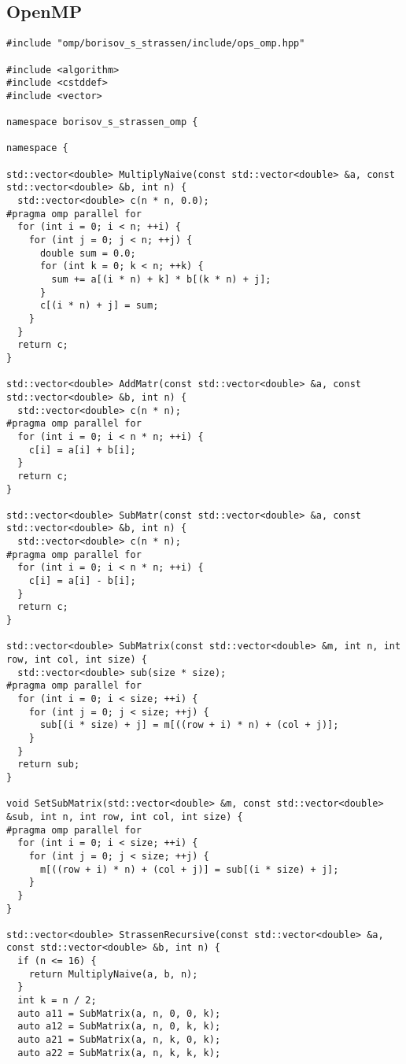 \documentclass[12pt]{article}
\begin{document}
\subsection*{OpenMP}
\begin{lstlisting}
#include "omp/borisov_s_strassen/include/ops_omp.hpp"

#include <algorithm>
#include <cstddef>
#include <vector>

namespace borisov_s_strassen_omp {

namespace {

std::vector<double> MultiplyNaive(const std::vector<double> &a, const std::vector<double> &b, int n) {
  std::vector<double> c(n * n, 0.0);
#pragma omp parallel for
  for (int i = 0; i < n; ++i) {
    for (int j = 0; j < n; ++j) {
      double sum = 0.0;
      for (int k = 0; k < n; ++k) {
        sum += a[(i * n) + k] * b[(k * n) + j];
      }
      c[(i * n) + j] = sum;
    }
  }
  return c;
}

std::vector<double> AddMatr(const std::vector<double> &a, const std::vector<double> &b, int n) {
  std::vector<double> c(n * n);
#pragma omp parallel for
  for (int i = 0; i < n * n; ++i) {
    c[i] = a[i] + b[i];
  }
  return c;
}

std::vector<double> SubMatr(const std::vector<double> &a, const std::vector<double> &b, int n) {
  std::vector<double> c(n * n);
#pragma omp parallel for
  for (int i = 0; i < n * n; ++i) {
    c[i] = a[i] - b[i];
  }
  return c;
}

std::vector<double> SubMatrix(const std::vector<double> &m, int n, int row, int col, int size) {
  std::vector<double> sub(size * size);
#pragma omp parallel for
  for (int i = 0; i < size; ++i) {
    for (int j = 0; j < size; ++j) {
      sub[(i * size) + j] = m[((row + i) * n) + (col + j)];
    }
  }
  return sub;
}

void SetSubMatrix(std::vector<double> &m, const std::vector<double> &sub, int n, int row, int col, int size) {
#pragma omp parallel for
  for (int i = 0; i < size; ++i) {
    for (int j = 0; j < size; ++j) {
      m[((row + i) * n) + (col + j)] = sub[(i * size) + j];
    }
  }
}

std::vector<double> StrassenRecursive(const std::vector<double> &a, const std::vector<double> &b, int n) {
  if (n <= 16) {
    return MultiplyNaive(a, b, n);
  }
  int k = n / 2;
  auto a11 = SubMatrix(a, n, 0, 0, k);
  auto a12 = SubMatrix(a, n, 0, k, k);
  auto a21 = SubMatrix(a, n, k, 0, k);
  auto a22 = SubMatrix(a, n, k, k, k);


\end{lstlisting}
\end{document}
